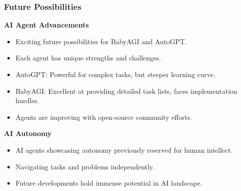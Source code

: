 \begin{frame}[fragile]
\frametitle{Future Possibilities}

\textbf{AI Agent Advancements}
\begin{itemize}
    \item Exciting future possibilities for BabyAGI and AutoGPT.
    \item Each agent has unique strengths and challenges.
    \item AutoGPT: Powerful for complex tasks, but steeper learning curve.
    \item BabyAGI: Excellent at providing detailed task lists, faces implementation hurdles.
    \item Agents are improving with open-source community efforts.
\end{itemize}

\textbf{AI Autonomy}
\begin{itemize}
    \item AI agents showcasing autonomy previously reserved for human intellect.
    \item Navigating tasks and problems independently.
    \item Future developments hold immense potential in AI landscape.
\end{itemize}

\end{frame}